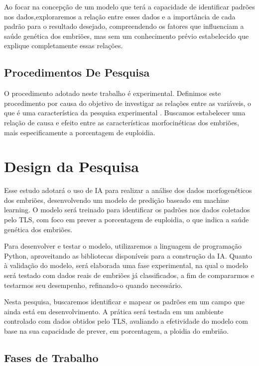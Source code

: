 Ao focar na concepção de um modelo que terá a capacidade de identificar padrões nos dados,exploraremos a relação entre esses dados e a importância de cada padrão para o resultado desejado, compreendendo os fatores que influenciam a saúde genética dos embriões, mas sem um conhecimento prévio estabelecido que explique completamente essas relações.

\subsection{Procedimentos De Pesquisa}

O procedimento adotado neste trabalho é experimental. Definimos este procedimento por causa do objetivo de investigar as relações entre as variáveis, o que é uma característica da pesquisa experimental \cite{nascimento2016}. Buscamos estabelecer uma relação de causa e efeito entre as características morfocinéticas dos embriões, mais especificamente a porcentagem de euploidia.

\section{Design da Pesquisa}

Esse estudo adotará o uso de IA para realizar a análise dos dados morfogenéticos dos embriões, desenvolvendo um modelo de predição baseado em machine learning. O modelo será treinado para identificar os padrões nos dados coletados pelo TLS, com foco em prever a porcentagem de euploidia, o que indica a saúde genética dos embriões.

Para desenvolver e testar o modelo, utilizaremos a linguagem de programação Python, aproveitando as bibliotecas disponíveis para a construção da IA. Quanto à validação do modelo, será elaborada uma fase experimental, na qual o modelo será testado com dados reais de embriões já classificados, a fim de compararmos e testarmos seu desempenho, refinando-o quando necessário.

Nesta pesquisa, buscaremos identificar e mapear os padrões em um campo que ainda está em desenvolvimento. A prática será testada em um ambiente controlado com dados obtidos pelo TLS, avaliando a efetividade do modelo com base na sua capacidade de prever, em porcentagem, a ploidia do embrião.

\subsection{Fases de Trabalho}

